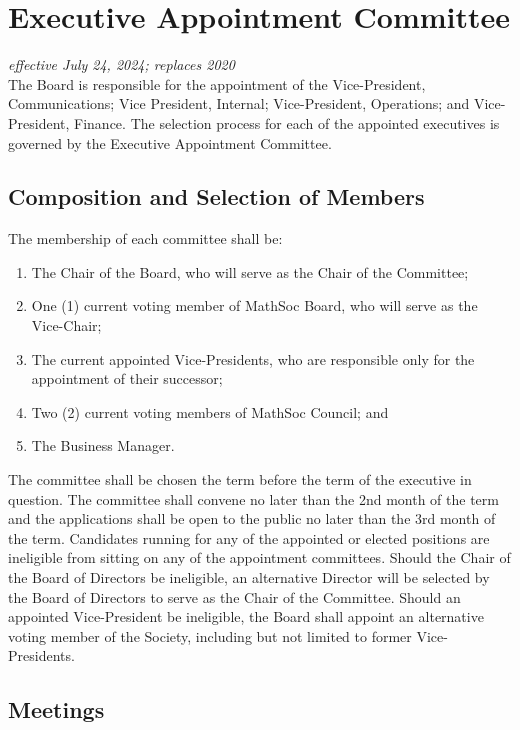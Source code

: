 \section{Executive Appointment Committee}
\emph{effective July 24, 2024; replaces 2020}\\

The Board is responsible for the appointment of the Vice-President, Communications; Vice President, Internal; Vice-President, Operations; and Vice-President, Finance.
The selection process for each of the appointed executives is governed by the Executive Appointment Committee.

\subsection{Composition and Selection of Members}

The membership of each committee shall be:
\begin{enumerate}
	\item The Chair of the Board, who will serve as the Chair of the Committee;
	\item One (1) current voting member of MathSoc Board, who will serve as the Vice-Chair;
	\item The current appointed Vice-Presidents, who are responsible only for the appointment of their successor;
	\item Two (2) current voting members of MathSoc Council; and
	\item The Business Manager.
\end{enumerate}

The committee shall be chosen the term before the term of the executive in question.
The committee shall convene no later than the 2nd month of the term and the applications shall be open to the public no later than the 3rd month of the term.
Candidates running for any of the appointed or elected positions are ineligible from sitting on any of the appointment committees.
Should the Chair of the Board of Directors be ineligible, an alternative Director will be selected by the Board of Directors to serve as the Chair of the Committee.
Should an appointed Vice-President be ineligible, the Board shall appoint an alternative voting member of the Society, including but not limited to former Vice-Presidents.

\subsection{Meetings}

